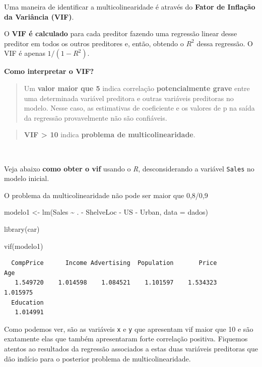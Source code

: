\documentclass[
  letterpaper,
  DIV=11,
  numbers=noendperiod]{scrartcl}
\newenvironment{Shaded}{\begin{snugshade}}{\end{snugshade}}
\newcommand{\AttributeTok}[1]{\textcolor[rgb]{0.40,0.45,0.13}{#1}}
\newcommand{\FunctionTok}[1]{\textcolor[rgb]{0.28,0.35,0.67}{#1}}
\newcommand{\NormalTok}[1]{\textcolor[rgb]{0.00,0.23,0.31}{#1}}
\newcommand{\OtherTok}[1]{\textcolor[rgb]{0.00,0.23,0.31}{#1}}
\newcommand{\SpecialCharTok}[1]{\textcolor[rgb]{0.37,0.37,0.37}{#1}}
\begin{document}
Uma maneira de identificar a multicolinearidade é através do
\textbf{Fator de Inflação da Variância (VIF)}.

O \textbf{VIF é calculado} para cada preditor fazendo uma regressão
linear desse preditor em todos os outros preditores e, então, obtendo o
\(R^2\) dessa regressão. O VIF é apenas \(1/(1-R^2)\).

\textbf{Como interpretar o VIF?}\\

\begin{quote}
Um \textbf{valor maior que 5} indica correlação \textbf{potencialmente
grave} entre uma determinada variável preditora e outras variáveis
preditoras no modelo. Nesse caso, as estimativas de coeficiente e os
valores de p na saída da regressão provavelmente não são confiáveis.
\end{quote}

\begin{quote}
\textbf{VIF \textgreater{} 10} indica \textbf{problema de
multicolinearidade}.
\end{quote}

~

Veja abaixo \textbf{como obter o vif} usando o \emph{R}, desconsiderando
a variável \texttt{Sales} no modelo inicial.

O problema da multicolinearidade não pode ser maior que 0,8/0,9

\begin{Shaded}
\begin{Highlighting}[]
\NormalTok{modelo1 }\OtherTok{\textless{}{-}} \FunctionTok{lm}\NormalTok{(Sales }\SpecialCharTok{\textasciitilde{}}\NormalTok{ . }\SpecialCharTok{{-}}\NormalTok{ ShelveLoc }\SpecialCharTok{{-}}\NormalTok{ US }\SpecialCharTok{{-}}\NormalTok{ Urban, }\AttributeTok{data =}\NormalTok{ dados)}

\FunctionTok{library}\NormalTok{(car) }

\FunctionTok{vif}\NormalTok{(modelo1)}
\end{Highlighting}
\end{Shaded}

\begin{verbatim}
  CompPrice      Income Advertising  Population       Price         Age 
   1.549720    1.014598    1.084521    1.101597    1.534323    1.015975 
  Education 
   1.014991 
\end{verbatim}

Como podemos ver, são as variáveis \texttt{x} e \texttt{y} que
apresentam vif maior que 10 e são exatamente elas que também
apresentaram forte correlação positiva. Fiquemos atentos ao resultados
da regressão associados a estas duas variáveis preditoras que dão
indício para o posterior problema de multicolinearidade.
\end{document}
